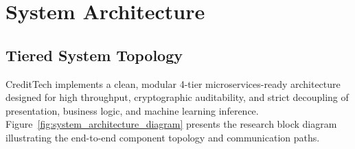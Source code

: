\chapter{System Architecture}
\label{chap:system_architecture}

\section{Tiered System Topology}
CreditTech implements a clean, modular 4-tier microservices-ready architecture designed for high throughput, cryptographic auditability, and strict decoupling of presentation, business logic, and machine learning inference. Figure~\ref{fig:system_architecture_diagram} presents the research block diagram illustrating the end-to-end component topology and communication paths.

